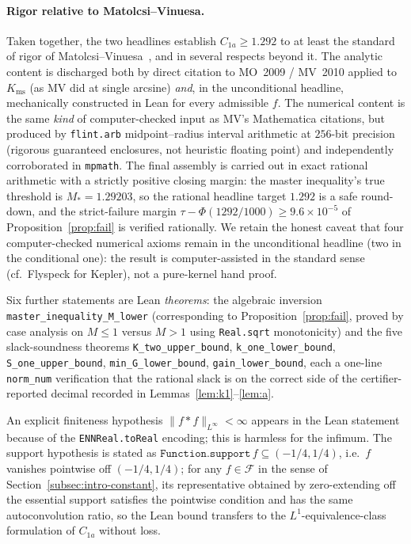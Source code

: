 \documentclass[11pt, letterpaper]{article}
\theoremstyle{paperplain}
\theoremstyle{paperdef}
\newcommand{\Linf}{L^\infty}
\newcommand{\Kms}{K_{\mathrm{ms}}}
\begin{document}
\paragraph{Rigor relative to Matolcsi--Vinuesa.}
Taken together, the two headlines establish $C_{1a}\ge 1.292$ to at
least the standard of rigor of Matolcsi--Vinuesa~\cite{MV10}, and in
several respects beyond it.  The analytic content is discharged both
by direct citation to MO~2009 / MV~2010 applied to $\Kms$ (as MV did
at single arcsine) \emph{and}, in the unconditional headline,
mechanically constructed in Lean for every admissible $f$.  The
numerical content is the same \emph{kind} of computer-checked input
as MV's Mathematica citations, but produced by \texttt{flint.arb}
midpoint--radius interval arithmetic at $256$-bit
precision~\cite{Flint} (rigorous guaranteed enclosures, not heuristic
floating point) and independently corroborated in \texttt{mpmath}.
The final assembly is carried out in exact rational arithmetic with a
strictly positive closing margin: the master inequality's true
threshold is $M_*=1.29203$, so the rational headline target
$1.292$ is a safe round-down, and the strict-failure margin
$\tau-\Phi(1292/1000)\ge 9.6\times 10^{-5}$ of
Proposition~\ref{prop:fail} is verified rationally.  We retain the
honest caveat that four computer-checked numerical axioms remain in
the unconditional headline (two in the conditional one): the result
is computer-assisted in the standard sense (cf.\ Flyspeck for
Kepler), not a pure-kernel hand proof.

Six further statements are Lean \emph{theorems}: the algebraic
inversion \texttt{master\_inequality\_M\_lower} (corresponding to
Proposition~\ref{prop:fail}, proved by case analysis on $M\le 1$ versus
$M>1$ using \texttt{Real.sqrt} monotonicity) and the five
slack-soundness theorems \texttt{K\_two\_upper\_bound},
\texttt{k\_one\_lower\_bound}, \texttt{S\_one\_upper\_bound},
\texttt{min\_G\_lower\_bound}, \texttt{gain\_lower\_bound}, each a
one-line \texttt{norm\_num} verification that the rational slack is on
the correct side of the certifier-reported decimal recorded in
Lemmas~\ref{lem:k1}--\ref{lem:a}.

An explicit finiteness hypothesis $\|f*f\|_{\Linf}<\infty$ appears in
the Lean statement because of the \texttt{ENNReal.toReal} encoding;
this is harmless for the infimum.  The support hypothesis is stated
as $\texttt{Function.support}\,f\subseteq(-1/4,1/4)$, i.e.\
$f$ vanishes pointwise off $(-1/4,1/4)$; for any
$f\in\mathcal{F}$ in the sense of Section~\ref{subsec:intro-constant},
its representative obtained by zero-extending off the essential
support satisfies the pointwise condition and has the same
autoconvolution ratio, so the Lean bound transfers to the
$L^1$-equivalence-class formulation of $C_{1a}$ without loss.
\end{document}
